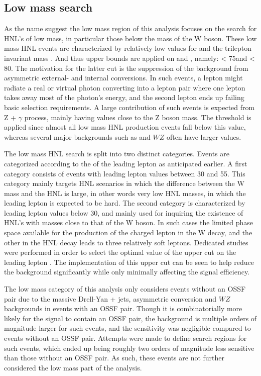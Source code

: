 \subsection{Low mass search}

As the name suggest the low mass region of this analysis focuses on
the search for HNL's of low mass, in particular those below the mass
of the W boson. These low mass HNL events are characterized by
relatively low values for \met  and the trilepton invariant mass
\mlll. And thus upper bounds are applied on \met  and \mlll , namely:
\met < 75\GeV and \mlll < 80\GeV. The motivation for the latter cut is
the suppression of the background from asymmetric external- and
internal conversions. In such events, a lepton might radiate a real or
virtual photon converting into a lepton pair where one lepton takes
away most of the photon's energy, and the second lepton ends up
failing basic selection requirements. A large contribution of such
events is expected from Z + $\gamma$ process, mainly having \mlll
values close to the Z boson mass.
The \met threshold is applied since almost all low mass HNL production
events fall below this value, whereas several major backgrounds such
as \ttbar and $WZ$ often have larger \met  values.

The low mass HNL search is split into two distinct categories. Events
are categorized according to the \pt of the leading lepton as
anticipated earlier. A first category consists of events with leading
lepton \pt values between 30 and 55\GeV. This category mainly targets
HNL scenarios in which the difference between the W mass and the HNL
is large, in other words very low HNL masses, in which the leading
lepton is expected to be hard. The second category is characterized by
leading lepton \pt values below 30\GeV, and mainly used for inquiring
the existence of HNL's with masses close to that of the W boson. In
such cases the limited phase space available for the production of the
charged lepton in the W decay, and the other in the HNL decay leads to
three relatively soft leptons.
Dedicated studies were performed in order to select the optimal value
of the upper \pt cut on the leading lepton \pt.
The implementation of this upper \pt cut can be seen to help reduce the background significantly while only minimally affecting the signal efficiency.

The low mass category of this analysis only considers events without
an OSSF pair due to the massive Drell-Yan + jets, asymmetric
conversion and $WZ$ backgrounds in events with an OSSF pair.
Though it is combinatorially more likely for the signal to contain an
OSSF pair, the background is multiple orders of magnitude larger for
such events,
and the sensitivity was negligible compared to events without an OSSF
pair.
Attempts were made to define search regions for such events, which
ended up being roughly two orders of magnitude less sensitive than
those without an OSSF pair.
 As such, these events are not further considered the low mass part of
 the analysis.


